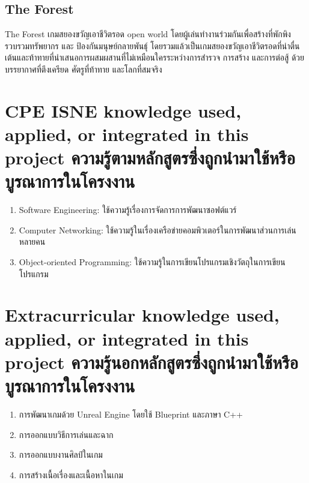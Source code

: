 \subsection{The Forest}

The Forest เกมสยองขวัญเอาชีวิตรอด open world โดยผู้เล่นทำงานร่วมกันเพื่อสร้างที่พักพิง รวบรวมทรัพยากร และ ป้องกันมนุษย์กลายพันธุ์ โดยรวมแล้วเป็นเกมสยองขวัญเอาชีวิตรอดที่น่าตื่นเต้นและท้าทายที่นำเสนอการผสมผสานที่ไม่เหมือนใครระหว่างการสำรวจ การสร้าง และการต่อสู้ ด้วยบรรยากาศที่ตึงเครียด ศัตรูที่ท้าทาย และโลกที่สมจริง 

\section{\ifenglish%
\ifcpe CPE \else ISNE \fi knowledge used, applied, or integrated in this project
\else%
ความรู้ตามหลักสูตรซึ่งถูกนำมาใช้หรือบูรณาการในโครงงาน
\fi
}

\begin{enumerate}
  \item Software Engineering: ใช้ความรู้เรื่องการจัดการการพัฒนาซอฟต์แวร์
  \item Computer Networking: ใช้ความรู้ในเรื่องเครือข่ายคอมพิวเตอร์ในการพัฒนาส่วนการเล่นหลายคน
  \item Object-oriented Programming: ใช้ความรู้ในการเขียนโปรแกรมเชิงวัตถุในการเขียนโปรแกรม
\end{enumerate}


\section{\ifenglish%
Extracurricular knowledge used, applied, or integrated in this project
\else%
ความรู้นอกหลักสูตรซึ่งถูกนำมาใช้หรือบูรณาการในโครงงาน
\fi
}

\begin{enumerate}
  \item การพัฒนาเกมด้วย Unreal Engine โดยใช้ Blueprint และภาษา C++
  \item การออกแบบวิธีการเล่นและฉาก
  \item การออกแบบงานศิลป์ในเกม
  \item การสร้างเนื้อเรื่องและเนื้อหาในเกม
\end{enumerate}

